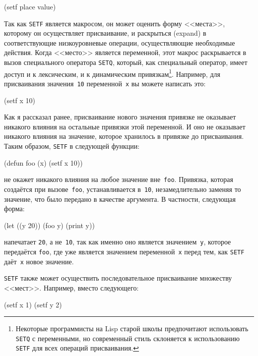 \begin{myverb}
(setf place value)
\end{myverb}

Так как \lstinline{SETF} является макросом, он может оценить форму <<места>>, которому он
осуществляет присваивание, и раскрыться (expand) в соответствующие низкоуровневые
операции, осуществляющие необходимые действия. Когда <<место>> является переменной, этот
макрос раскрывается в вызов специального оператора \lstinline{SETQ}, который, как специальный
оператор, имеет доступ и к лексическим, и к динамическим привязкам\footnote{Некоторые
  программисты на Lisp старой школы предпочитают использовать \lstinline{SETQ} с переменными,
  но современный стиль склоняется к использованию \lstinline{SETF} для всех операций
  присваивания.}. Например, для присваивания значения~\lstinline{10} переменной~\lstinline{x} вы можете написать
это:

\begin{myverb}
(setf x 10)
\end{myverb}

Как я рассказал ранее, присваивание нового значения привязке не оказывает никакого влияния
на остальные привязки этой переменной. И оно не оказывает никакого влияния на значение,
которое хранилось в привязке до присваивания. Таким образом, \lstinline{SETF} в следующей
функции:

\begin{myverb}
(defun foo (x) (setf x 10))
\end{myverb}

\noindent{}не окажет никакого влияния на любое значение вне~\lstinline{foo}. Привязка, которая создаётся при
вызове~\lstinline{foo}, устанавливается в~\lstinline{10}, незамедлительно заменяя то значение, что было передано в
качестве аргумента. В частности, следующая форма:

\begin{myverb}
(let ((y 20))
  (foo y)
  (print y))
\end{myverb}

\noindent{}напечатает \lstinline{20}, а не~\lstinline{10}, так как именно оно является значением~\lstinline{y}, которое передаётся
\lstinline{foo}, где уже является значением переменной~\lstinline{x} перед тем, как \lstinline{SETF}
даёт~\lstinline{x} новое значение.

\lstinline{SETF} также может осуществить последовательное присваивание множеству
<<мест>>. Например, вместо следующего:

\begin{myverb}
(setf x 1)
(setf y 2)
\end{myverb}


